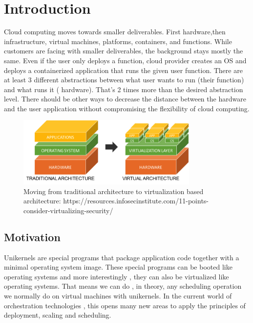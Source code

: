 
\chapter{Introduction}\label{chapter:introduction}
Cloud computing moves towards smaller deliverables. First hardware,then infrastructure, virtual machines, platforms, containers, and functions. While customers are facing with smaller deliverables, the background stays mostly the same. Even if the user only deploys a function, cloud provider creates an OS and deploys a containerized application that runs the given user function. There are at least 3 different abstractions between what user wants to run (their function) and what runs it ( hardware). That's 2 times more than the desired abstraction level. There should be other ways to decrease the distance between the hardware and the user application without compromising the flexibility of cloud computing. 
\begin{figure}[htpb]
  \centering
  \includegraphics[width=0.8\textwidth]{figures/1-123.png}
  \caption{Moving from traditional architecture to virtualization based architecture: https://resources.infosecinstitute.com/11-points-consider-virtualizing-security/} \label{fig:arch}
\end{figure}
\section{Motivation}
Unikernels are special programs that package application code together with a minimal operating system image.\cite{7396164} These special programs can be booted like operating systems and more interestingly , they can also be virtualized like operating systems. That means we can do , in theory, any scheduling operation we normally do on virtual machines with unikernels. In the current world of orchestration technologies , this opens many new areas to apply the principles of deployment, scaling and scheduling.

